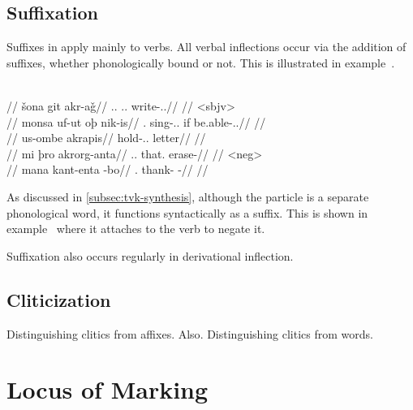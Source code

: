 \subsection{Suffixation}
\label{subsec:tvk-suffixation}

Suffixes in \langtvk{} apply mainly to verbs. All verbal inflections occur via the addition of suffixes, whether phonologically bound or not. This is illustrated in example~.

	\begingl
		\glpreamble{}\\
		//
		\gla šona git akr-aǧ//
		\glb \Tpp.\An.\Top{} \Tps.\In.\Acc{} write-\Ind.\Pst.\Rtsp//
		\glft {}//
	\endgl
	\a<sbjv>\begingl
		\glpreamble{}\\
		//
		\gla monsa uf-ut oþ nik-is//
		\glb \Fpc.\Top{} sing-\Ind.\Npst.\Pfv{} if be.able-\Sbjv.\Npst.\Ipfv//
		\glft {}//
	\endgl
	\a<iii:pptcp>\begingl
		\glpreamble{}\\
		//
		\gla us-ombe akrapis//
		\glb hold-\Pass.\Ptcp.\In{} letter//
		\glft {}//
	\endgl
	\a<i:imp>\begingl
		\glpreamble{}\\
		//
		\gla mi þro akrorg-anta//
		\glb \In.\Sg.\Top{} that.\Med{} erase-\Imp//
		\glft {}//
	\endgl
	\a<neg>\begingl
		\glpreamble{}\\
		//
		\gla mana kant-enta -bo//
		\glb \Fpp.\Top{} thank-\Imp{} -\Neg//
		\glft {}//
	\endgl
\xe

As discussed in \autoref{subsec:tvk-synthesis}, although the particle  is a separate phonological word, it functions syntactically as a suffix. This is shown in example~ where it attaches to the verb  to negate it.

Suffixation also occurs regularly in derivational inflection.

\subsection{Cliticization}
\label{subsec:tvk-cliticization}

Distinguishing clitics from affixes\autocite{Zwicky-and-pullum-1983}. Also\autocite{spencer-luis-2012}. Distinguishing clitics from words\autocite{Zwicky-1985}.


\section{Locus of Marking}
\label{sec:tvk-locus}

